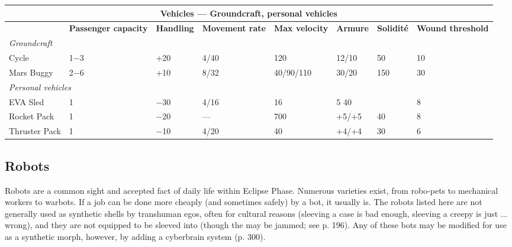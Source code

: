 \begin{table} \begin{tabularx}{\textwidth}{|l|X|X|X|X|X|X|X|} \hline

\multicolumn{8}{|c|}{\textbf{Vehicles --- Groundcraft, personal vehicles}} \\ \hline

&\textbf{Passenger capacity}	&\textbf{Handling}	&\textbf{Movement rate}	&\textbf{Max velocity}	&\textbf{Armure}	&\textbf{Solidité}	&\textbf{Wound threshold} \\ \hline

\multicolumn{8}{|l|}{\emph{Groundcraft}} \\ \hline

Cycle	&1$-$3	&+20	&4/40	&120	&12/10	&50	&10 \\ \hline

Mars Buggy	&2$-$6	&+10	&8/32	&40/90/110	&30/20	&150	&30 \\ \hline

\multicolumn{8}{|l|}{\emph{Personal vehicles}} \\ \hline

EVA Sled	&1	&$-$30	&4/16	&16	&5 40	&&8 \\ \hline

Rocket Pack	&1	&$-$20	&--- &700	&+5/+5	&40	&8 \\ \hline

Thruster Pack	&1	&$-$10	&4/20	&40	&+4/+4	&30	&6 \\ \hline

\end{tabularx} \label{tab:groundcraft-personal} \end{table} 



\subsection{Robots} \label{sec:robots} 

Robots are a common sight and accepted fact of daily life within Eclipse Phase. Numerous varieties exist, from robo-pets to mechanical workers to warbots. If a job can be done more cheaply (and sometimes safely) by a bot, it usually is. The robots listed here are not generally used as synthetic shells by transhuman egos, often for cultural reasons (sleeving a case is bad enough, sleeving a creepy is just ... wrong), and they are not equipped to be sleeved into (though the may be jammed; see p. 196). Any of these bots may be modified for use as a synthetic morph, however, by adding a cyberbrain system (p. 300). 

